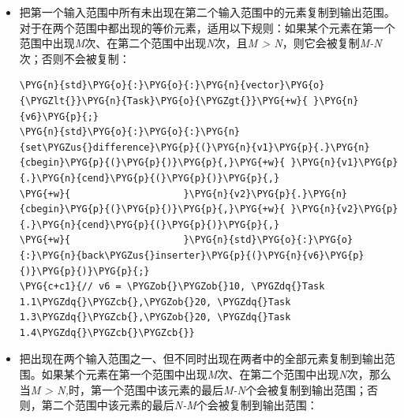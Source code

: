 \begin{itemize}

\item {}把第一个输入范围中所有未出现在第二个输入范围中的元素复制到输出范围。对于在两个范围中都出现的等价元素，适用以下规则：如果某个元素在第一个范围中出现\textit{M}次、在第二个范围中出现\textit{N}次，且\textit{M > N}，则它会被复制\textit{M-N}次；否则不会被复制：



\begin{codeblockbg}
\begin{Verbatim}[commandchars=\\\{\},breaklines=true,breakanywhere=true,fontsize=\codefont,xleftmargin=17bp]
\PYG{n}{std}\PYG{o}{:}\PYG{o}{:}\PYG{n}{vector}\PYG{o}{\PYGZlt{}}\PYG{n}{Task}\PYG{o}{\PYGZgt{}}\PYG{+w}{ }\PYG{n}{v6}\PYG{p}{;}
\PYG{n}{std}\PYG{o}{:}\PYG{o}{:}\PYG{n}{set\PYGZus{}difference}\PYG{p}{(}\PYG{n}{v1}\PYG{p}{.}\PYG{n}{cbegin}\PYG{p}{(}\PYG{p}{)}\PYG{p}{,}\PYG{+w}{ }\PYG{n}{v1}\PYG{p}{.}\PYG{n}{cend}\PYG{p}{(}\PYG{p}{)}\PYG{p}{,}
\PYG{+w}{                    }\PYG{n}{v2}\PYG{p}{.}\PYG{n}{cbegin}\PYG{p}{(}\PYG{p}{)}\PYG{p}{,}\PYG{+w}{ }\PYG{n}{v2}\PYG{p}{.}\PYG{n}{cend}\PYG{p}{(}\PYG{p}{)}\PYG{p}{,}
\PYG{+w}{                    }\PYG{n}{std}\PYG{o}{:}\PYG{o}{:}\PYG{n}{back\PYGZus{}inserter}\PYG{p}{(}\PYG{n}{v6}\PYG{p}{)}\PYG{p}{)}\PYG{p}{;}
\PYG{c+c1}{// v6 = \PYGZob{}\PYGZob{}10, \PYGZdq{}Task 1.1\PYGZdq{}\PYGZcb{},\PYGZob{}20, \PYGZdq{}Task 1.3\PYGZdq{}\PYGZcb{},\PYGZob{}20, \PYGZdq{}Task 1.4\PYGZdq{}\PYGZcb{}\PYGZcb{}}
\end{Verbatim}
\end{codeblockbg}



\item {}把出现在两个输入范围之一、但不同时出现在两者中的全部元素复制到输出范围。如果某个元素在第一个范围中出现\textit{M}次、在第二个范围中出现\textit{N}次，那么当\textit{M > N,}时，第一个范围中该元素的最后\textit{M-N}个会被复制到输出范围；否则，第二个范围中该元素的最后\textit{N-M}个会被复制到输出范围：




\end{itemize}
